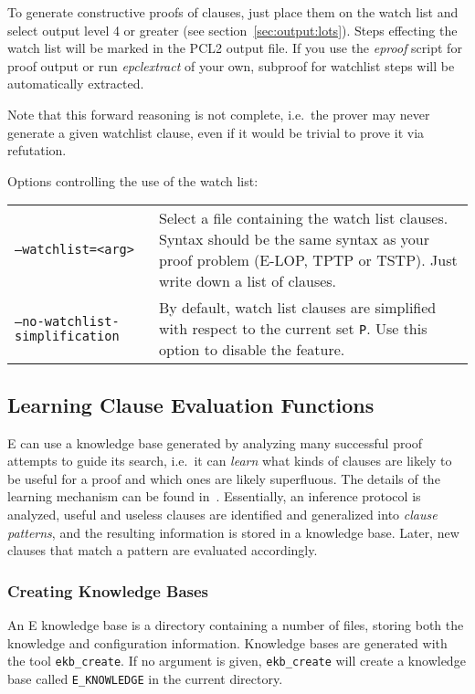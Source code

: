 \documentclass{article}
\begin{document}
To generate constructive proofs of clauses, just place them on the
watch list and select output level 4 or greater (see
section~\ref{sec:output:lots}). Steps effecting the watch list will be
marked in the PCL2 output file. If you use the \emph{eproof} script
for proof output or run \emph{epclextract} of your own, subproof for
watchlist steps will be automatically extracted.

Note that this forward reasoning is not complete, i.e.\ the prover may
never generate a given watchlist clause, even if it would be trivial
to prove it via refutation.

Options controlling the use of the watch list:\\
\begin{tabular}{lp{5.8cm}}
  \texttt{--watchlist=<arg>} & Select a file containing the watch list
  clauses. Syntax should be the same syntax as your proof problem
  (E-LOP, TPTP or TSTP). Just write down a list of clauses.\\
  \texttt{--no-watchlist-simplification} & By default, watch list
  clauses are simplified with respect to the current set
  \texttt{P}. Use this option to disable the feature.
\end{tabular}


\subsection{Learning Clause Evaluation Functions}
\label{sec:options:learning}

E can use a knowledge base generated by analyzing many successful
proof attempts to guide its search, i.e.\ it can \emph{learn} what
kinds of clauses are likely to be useful for a proof and which ones
are likely superfluous. The details of the learning mechanism can be
found in~\cite{Schulz:Diss-2000,Schulz:KI-2001}. Essentially, an
inference protocol is analyzed, useful and useless clauses are
identified and generalized into \emph{clause patterns}, and the
resulting information is stored in a knowledge base. Later, new clauses
that match a pattern are evaluated accordingly.

\subsubsection{Creating Knowledge Bases}

An E knowledge base is a directory containing a number of files,
storing both the knowledge and configuration information. Knowledge
bases are generated with the tool \texttt{ekb\_create}. If no argument
is given, \texttt{ekb\_create} will create a knowledge base called
\texttt{E\_KNOWLEDGE} in the current directory.
\end{document}
